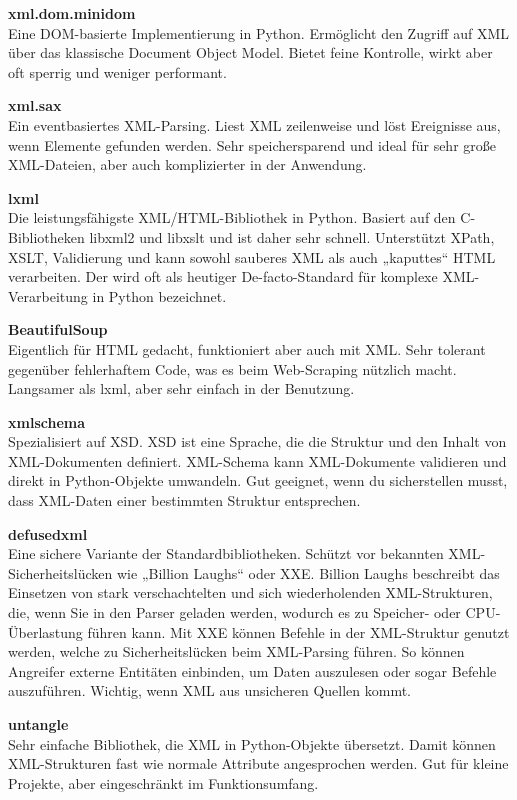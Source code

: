 \textbf{xml.dom.minidom}\\
Eine DOM-basierte Implementierung in Python.
Ermöglicht den Zugriff auf XML über das klassische Document Object Model.
Bietet feine Kontrolle, wirkt aber oft sperrig und weniger performant. \cite*{xml.dom.minidom}

\textbf{xml.sax}\\
Ein eventbasiertes XML-Parsing.
Liest XML zeilenweise und löst Ereignisse aus, wenn Elemente gefunden werden.
Sehr speichersparend und ideal für sehr große XML-Dateien, aber auch komplizierter in der Anwendung. \cite*{xml.sax}

\textbf{lxml}\\
Die leistungsfähigste XML/HTML-Bibliothek in Python.
Basiert auf den C-Bibliotheken libxml2 und libxslt und ist daher sehr schnell.
Unterstützt XPath, \ac{XSLT}, Validierung und kann sowohl sauberes XML als auch „kaputtes“ HTML verarbeiten.
Der wird oft als heutiger De-facto-Standard für komplexe XML-Verarbeitung in Python bezeichnet. \cite*{lxml}

\textbf{BeautifulSoup}\\
Eigentlich für HTML gedacht, funktioniert aber auch mit XML. Sehr tolerant gegenüber fehlerhaftem Code, was es beim Web-Scraping nützlich macht.
Langsamer als lxml, aber sehr einfach in der Benutzung. \cite*{BeautifulSoup}

\textbf{xmlschema}\\
Spezialisiert auf \ac{XSD}.
\ac{XSD} ist eine Sprache, die die Struktur und den Inhalt von XML-Dokumenten definiert.
XML-Schema kann XML-Dokumente validieren und direkt in Python-Objekte umwandeln.
Gut geeignet, wenn du sicherstellen musst, dass XML-Daten einer bestimmten Struktur entsprechen. \cite*{xmlschema}

\textbf{defusedxml}\\
Eine sichere Variante der Standardbibliotheken.
Schützt vor bekannten XML-Sicherheitslücken wie „Billion Laughs“ oder \ac{XXE}.
Billion Laughs beschreibt das Einsetzen von stark verschachtelten und sich wiederholenden \ac{XML}-Strukturen, die, wenn Sie in
den Parser geladen werden, wodurch es zu Speicher- oder CPU-Überlastung führen kann.
Mit \ac{XXE} können Befehle in der XML-Struktur genutzt werden, welche zu Sicherheitslücken beim XML-Parsing führen.
So können Angreifer externe Entitäten einbinden, um Daten auszulesen oder sogar Befehle auszuführen.
Wichtig, wenn XML aus unsicheren Quellen kommt. \cite*{defusedxml}

\textbf{untangle}\\
Sehr einfache Bibliothek, die XML in Python-Objekte übersetzt.
Damit können XML-Strukturen fast wie normale Attribute angesprochen werden.
Gut für kleine Projekte, aber eingeschränkt im Funktionsumfang. \cite*{untangle}